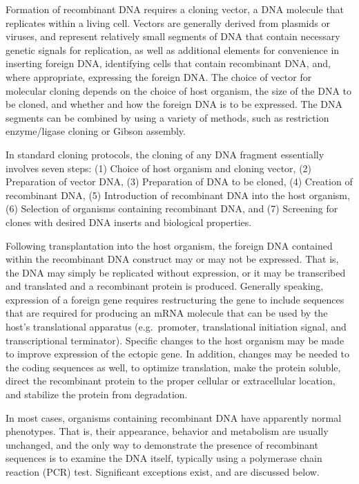 Formation of recombinant DNA requires a cloning vector, a DNA molecule that replicates within a living cell. Vectors are generally derived from plasmids or viruses, and represent relatively small segments of DNA that contain necessary genetic signals for replication, as well as additional elements for convenience in inserting foreign DNA, identifying cells that contain recombinant DNA, and, where appropriate, expressing the foreign DNA. The choice of vector for molecular cloning depends on the choice of host organism, the size of the DNA to be cloned, and whether and how the foreign DNA is to be expressed. The DNA segments can be combined by using a variety of methods, such as restriction enzyme/ligase cloning or Gibson assembly.

In standard cloning protocols, the cloning of any DNA fragment essentially involves seven steps: (1) Choice of host organism and cloning vector, (2) Preparation of vector DNA, (3) Preparation of DNA to be cloned, (4) Creation of recombinant DNA, (5) Introduction of recombinant DNA into the host organism, (6) Selection of organisms containing recombinant DNA, and (7) Screening for clones with desired DNA inserts and biological properties.

Following transplantation into the host organism, the foreign DNA contained within the recombinant DNA construct may or may not be expressed. That is, the DNA may simply be replicated without expression, or it may be transcribed and translated and a recombinant protein is produced. Generally speaking, expression of a foreign gene requires restructuring the gene to include sequences that are required for producing an mRNA molecule that can be used by the host's translational apparatus (e.g.~promoter, translational initiation signal, and transcriptional terminator). Specific changes to the host organism may be made to improve expression of the ectopic gene. In addition, changes may be needed to the coding sequences as well, to optimize translation, make the protein soluble, direct the recombinant protein to the proper cellular or extracellular location, and stabilize the protein from degradation.

In most cases, organisms containing recombinant DNA have apparently normal phenotypes. That is, their appearance, behavior and metabolism are usually unchanged, and the only way to demonstrate the presence of recombinant sequences is to examine the DNA itself, typically using a polymerase chain reaction (PCR) test. Significant exceptions exist, and are discussed below.

